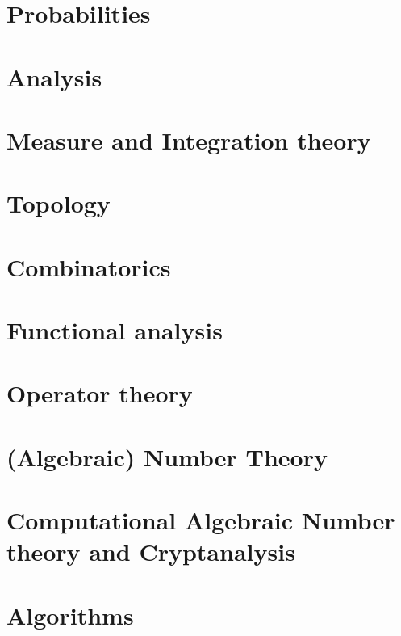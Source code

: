 \documentclass{scrartcl}
\begin{document}
\section{Probabilities}



\section{Analysis}



\section{Measure and Integration theory}



\section{Topology}



\section{Combinatorics}



\section{Functional analysis}



\section{Operator theory}



\section{(Algebraic) Number Theory}



\section{Computational Algebraic Number theory and Cryptanalysis}



\section{Algorithms}


\end{document}
